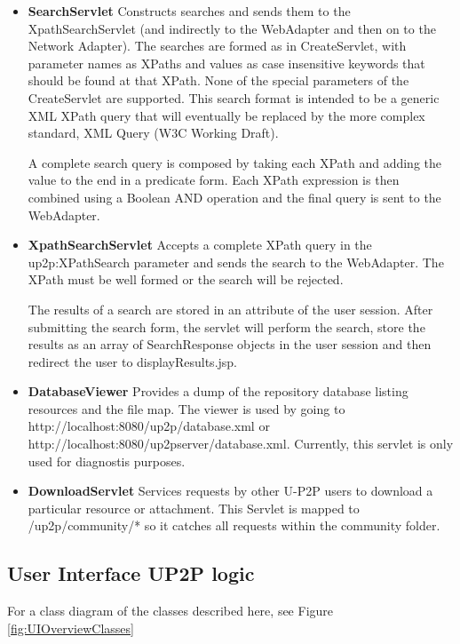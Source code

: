 \documentclass[titlepage]{article}%
\begin{document}
\begin{itemize}
\item \textbf{SearchServlet} Constructs searches and sends them to the XpathSearchServlet (and indirectly to the WebAdapter and then on to the Network Adapter). The searches are formed as in CreateServlet, with parameter names as XPaths and values as case insensitive keywords that should be found at that XPath. None of the special parameters of the CreateServlet are supported. This search format is intended to be a generic XML XPath query that will eventually be replaced by the more complex standard, XML Query (W3C Working Draft).

A complete search query is composed by taking each XPath and adding the value to the end in a predicate form. Each XPath expression is then combined using a Boolean AND operation and the final query is sent to the WebAdapter.

\item \textbf{XpathSearchServlet} Accepts a complete XPath query in the up2p:XPathSearch parameter and sends the search to the WebAdapter. The XPath must be well formed or the search will be rejected.

The results of a search are stored in an attribute of the user session. After submitting the search form, the servlet will perform the search, store the results as an array of SearchResponse objects in the user session and then redirect the user to displayResults.jsp.

\item \textbf{DatabaseViewer} Provides a dump of the repository database listing resources and the file map. The viewer is used by going to http://localhost:8080/up2p/database.xml or http://localhost:8080/up2pserver/database.xml. Currently, this servlet is only used for diagnostis purposes.

\item \textbf{DownloadServlet} Services requests by other U-P2P users to download a particular resource or attachment. This Servlet is mapped to /up2p/community/* so it catches all requests within the community folder.

\end{itemize}

\subsection{User Interface UP2P logic}
\label{sec:defWebAdapter}

For a class diagram of the classes described here, see Figure \ref{fig:UIOverviewClasses}
\end{document}
